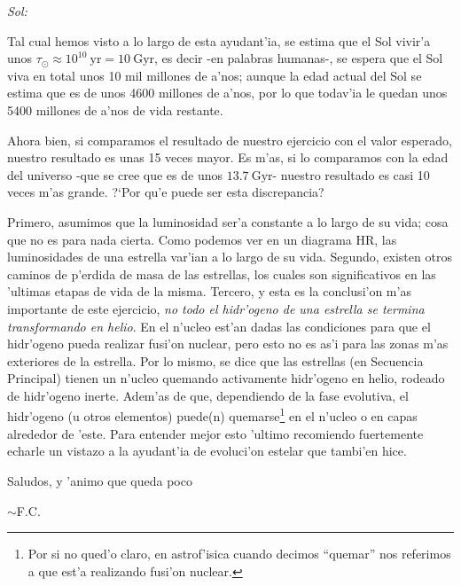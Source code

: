 \documentclass{article}
\begin{document}
\vspace{2mm}
\emph{Sol:}
\vspace{2mm}

Tal cual hemos visto a lo largo de esta ayudant'ia, se estima que el Sol vivir'a unos $\tau_\odot \approx 10^{10} \ \text{yr} = 10 \ \text{Gyr}$, es decir -en palabras humanas-, se espera que el Sol viva en total unos 10 mil millones de a'nos; aunque la edad actual del Sol se estima que es de unos 4600 millones de a'nos, por lo que todav'ia le quedan unos 5400 millones de a'nos de vida restante. 

Ahora bien, si comparamos el resultado de nuestro ejercicio con el valor esperado, nuestro resultado es unas 15 veces mayor. Es m'as, si lo comparamos con la edad del universo -que se cree que es de unos $13.7 \ \text{Gyr}$- nuestro resultado es casi 10 veces m'as grande. ?`Por qu'e puede ser esta discrepancia? 

Primero, asumimos que la luminosidad ser'a constante a lo largo de su vida; cosa que no es para nada cierta. Como podemos ver en un diagrama HR, las luminosidades de una estrella var'ian a lo largo de su vida. Segundo, existen otros caminos de p'erdida de masa de las estrellas, los cuales son significativos en las 'ultimas etapas de vida de la misma. Tercero, y esta es la conclusi'on m'as importante de este ejercicio, \emph{no todo el hidr'ogeno de una estrella se termina transformando en helio}. En el n'ucleo est'an dadas las condiciones para que el hidr'ogeno pueda realizar fusi'on nuclear, pero esto no es as'i para las zonas m'as exteriores de la estrella. Por lo mismo, se dice que las estrellas (en Secuencia Principal) tienen un n'ucleo quemando activamente hidr'ogeno en helio, rodeado de hidr'ogeno inerte. Adem'as de que, dependiendo de la fase evolutiva, el hidr'ogeno (u otros elementos) puede(n) quemarse\footnote{Por si no qued'o claro, en astrof'isica cuando decimos ``quemar'' nos referimos a que est'a realizando fusi'on nuclear.} en el n'ucleo o en capas alrededor de 'este. Para entender mejor esto 'ultimo recomiendo fuertemente echarle un vistazo a la ayudant'ia de evoluci'on estelar que tambi'en hice.

\vspace{3mm}


\begin{flushright}
Saludos, y 'animo que queda poco


$\sim$F.C.
\end{flushright}
\end{document}
